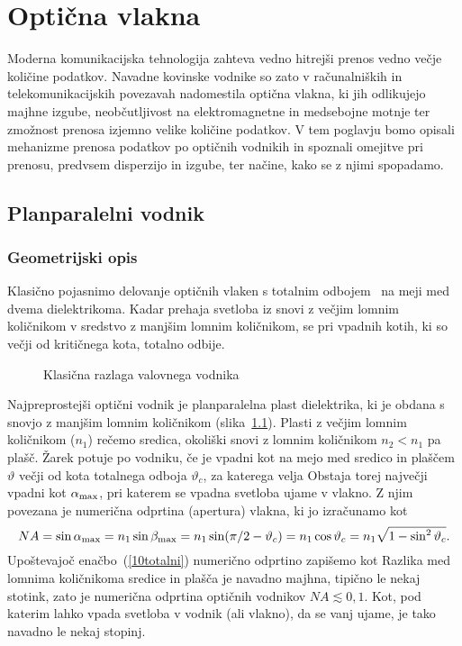 
\chapter{Optična vlakna}
\label{chap:fibri}
Moderna komunikacijska tehnologija zahteva vedno hitrejši prenos
vedno večje količine podatkov. Navadne kovinske vodnike
so zato v računalniških in telekomunikacijskih povezavah nadomestila optična 
vlakna, ki jih odlikujejo majhne izgube, neobčutljivost na elektromagnetne
in medsebojne motnje ter zmožnost prenosa izjemno velike količine podatkov. 
V tem poglavju bomo opisali mehanizme prenosa podatkov po optičnih vodnikih
in spoznali omejitve pri prenosu,
predvsem disperzijo in izgube, ter načine, kako se z njimi 
spopadamo.

\section{Planparalelni vodnik}
\subsection*{Geometrijski opis}
Klasično pojasnimo delovanje optičnih vlaken s totalnim odbojem~
na meji med dvema dielektrikoma. Kadar prehaja svetloba iz snovi 
z večjim lomnim količnikom v sredstvo z manjšim lomnim količnikom,
se pri vpadnih kotih, ki so večji od kritičnega kota, totalno odbije. 
\begin{figure}[h]
\centering
\def\svgwidth{110truemm} 

\caption{Klasična razlaga valovnega vodnika}
\label{fig:vodnik}
\end{figure}

Najpreprostejši optični vodnik je planparalelna plast 
dielektrika, ki je obdana s snovjo z manjšim lomnim količnikom (slika~\ref{fig:vodnik}). 
Plasti z večjim lomnim količnikom ($n_1$) rečemo sredica, 
okoliški snovi z lomnim količnikom $n_2<n_1$ pa plašč. 
Žarek potuje po vodniku, če je vpadni kot 
na mejo med sredico in plaščem $\vartheta$ večji od kota totalnega odboja $\vartheta_c$, 
za katerega velja
Obstaja torej največji vpadni kot $\alpha_{\rm max}$, pri katerem se
vpadna svetloba ujame v vlakno.
Z njim povezana je numerična odprtina (apertura) vlakna, 
ki jo izračunamo kot 
\begin{equation}
NA = \sin \alpha_{\rm max} = n_1 \sin \beta_{\rm max} = 
n_1 \sin(\pi/2-\vartheta_c) =
n_1 \cos\vartheta_c = n_1 \sqrt{1-\sin^2\vartheta_c}.
\label{10NAa}
\end{equation}
Upoštevajoč enačbo~(\ref{10totalni}) numerično odprtino zapišemo kot 
Razlika med lomnima količnikoma sredice in plašča je navadno majhna,
tipično le nekaj stotink, zato je numerična odprtina optičnih 
vodnikov $NA \lesssim 0,1 $. Kot, pod katerim lahko vpada svetloba
v vodnik (ali vlakno), da se vanj ujame, je tako navadno le nekaj stopinj.

